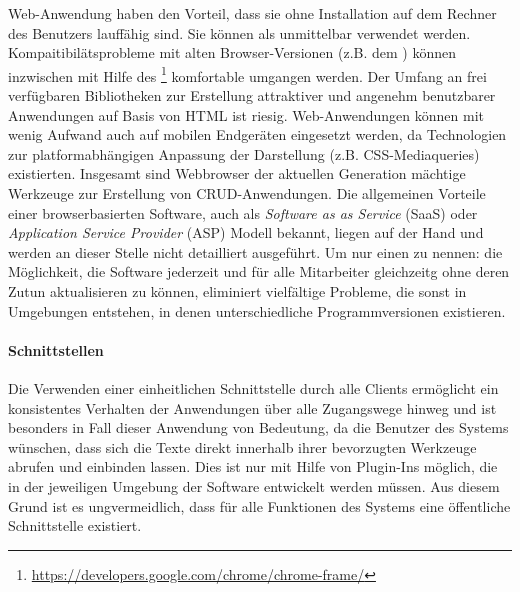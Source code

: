 Web-Anwendung haben den Vorteil, dass sie ohne Installation auf dem Rechner des Benutzers lauffähig sind. Sie können als unmittelbar verwendet werden. Kompaitibilätsprobleme mit alten Browser-Versionen (z.B. dem ) können inzwischen mit Hilfe des \footnote{\url{https://developers.google.com/chrome/chrome-frame/}} komfortable umgangen werden. Der Umfang an frei verfügbaren Bibliotheken zur Erstellung attraktiver und angenehm benutzbarer Anwendungen auf Basis von HTML ist riesig. Web-Anwendungen können mit wenig Aufwand auch auf mobilen Endgeräten eingesetzt werden, da Technologien zur platformabhängigen Anpassung der Darstellung (z.B. CSS-Mediaqueries) existierten. Insgesamt sind Webbrowser der aktuellen Generation mächtige Werkzeuge zur Erstellung von CRUD-Anwendungen. \cite{ms-key-software-development-trends} Die allgemeinen Vorteile einer browserbasierten Software, auch als \emph{Software as as Service} (SaaS) oder \emph{Application Service Provider} (ASP) Modell bekannt, liegen auf der Hand und werden an dieser Stelle nicht detailliert ausgeführt. Um nur einen zu nennen: die Möglichkeit, die Software jederzeit und für alle Mitarbeiter gleichzeitg ohne deren Zutun aktualisieren zu können, eliminiert vielfältige Probleme, die sonst in Umgebungen entstehen, in denen unterschiedliche Programmversionen existieren.

\paragraph{Schnittstellen} Die Verwenden einer einheitlichen Schnittstelle durch alle Clients ermöglicht ein konsistentes Verhalten der Anwendungen über alle Zugangswege hinweg und ist besonders in Fall dieser Anwendung von Bedeutung, da die Benutzer des Systems wünschen, dass sich die Texte direkt innerhalb ihrer bevorzugten Werkzeuge abrufen und einbinden lassen. Dies ist nur mit Hilfe von Plugin-Ins möglich, die in der jeweiligen Umgebung der Software entwickelt werden müssen. Aus diesem Grund ist es ungvermeidlich, dass für alle Funktionen des Systems eine öffentliche Schnittstelle existiert.

